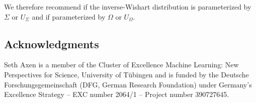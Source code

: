 \documentclass[12pt,a4paper,reqno]{amsart}
\numberwithin{equation}{section}
\begin{document}
We therefore recommend  if the inverse-Wishart distribution is parameterized by $\Sigma$ or $U_\Sigma$ and  if parameterized by $\Omega$ or $U_\Omega$.

\subsection*{Acknowledgments}

Seth Axen is a member of the Cluster of Excellence Machine Learning: New Perspectives for Science, University of Tübingen and is funded by the Deutsche Forschungsgemeinschaft (DFG, German Research Foundation) under Germany’s Excellence Strategy – EXC number 2064/1 – Project number 390727645.

\printbibliography
\end{document}
